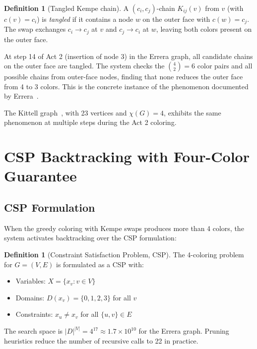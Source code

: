 \documentclass[12pt,letterpaper]{article}
\theoremstyle{plain}
\theoremstyle{definition}
\newtheorem{definition}[theorem]{Definition}
\theoremstyle{remark}
\begin{document}
\begin{definition}[Tangled Kempe chain]
A $(c_i, c_j)$-chain $K_{ij}(v)$ from $v$ (with $c(v) = c_i$) is \emph{tangled}
if it contains a node $w$ on the outer face with $c(w) = c_j$. The swap
exchanges $c_i \to c_j$ at $v$ and $c_j \to c_i$ at $w$, leaving both colors
present on the outer face.
\end{definition}

At step 14 of Act 2 (insertion of node 3) in the Errera graph, all candidate
chains on the outer face are tangled. The system checks the $\binom{4}{2} = 6$
color pairs and all possible chains from outer-face nodes, finding that none
reduces the outer face from 4 to 3 colors. This is the concrete instance of the
phenomenon documented by Errera~\cite{errera1921}.

The Kittell graph~\cite{kittell1935}, with 23 vertices and $\chi(G) = 4$,
exhibits the same phenomenon at multiple steps during the Act 2 coloring.

\section{CSP Backtracking with Four-Color Guarantee}
\label{sec:backtracking}

\subsection{CSP Formulation}

When the greedy coloring with Kempe swaps produces more than 4 colors, the
system activates backtracking over the CSP formulation:

\begin{definition}[Constraint Satisfaction Problem, CSP]
The 4-coloring problem for $G = (V, E)$ is formulated as a CSP with:
\begin{itemize}[noitemsep]
    \item Variables: $X = \{x_v : v \in V\}$
    \item Domains: $D(x_v) = \{0, 1, 2, 3\}$ for all $v$
    \item Constraints: $x_u \neq x_v$ for all $\{u,v\} \in E$
\end{itemize}
\end{definition}

The search space is $|D|^{|V|} = 4^{17} \approx 1.7 \times 10^{10}$ for the
Errera graph. Pruning heuristics reduce the number of recursive calls to 22 in
practice.
\end{document}

